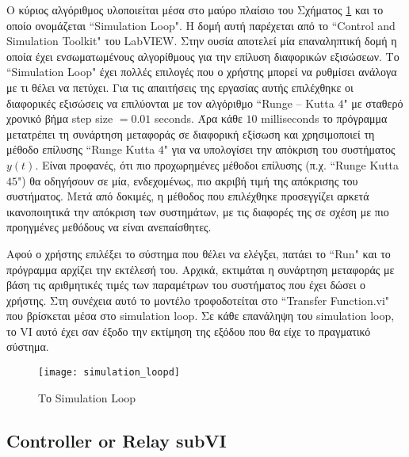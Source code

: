 Ο κύριος αλγόριθμος υλοποιείται μέσα στο μαύρο πλαίσιο του Σχήματος \ref{fig:simulation_loopd} και το οποίο ονομάζεται ``Simulation Loop". Η δομή αυτή παρέχεται από το ``Control and Simulation Toolkit" του LabVIEW. Στην ουσία αποτελεί μία επαναληπτική δομή η οποία έχει ενσωματωμένους αλγορίθμους για την επίλυση διαφορικών εξισώσεων. Το ``Simulation Loop" έχει πολλές επιλογές που ο χρήστης μπορεί να ρυθμίσει ανάλογα με τι θέλει να πετύχει. Για τις απαιτήσεις της εργασίας αυτής επιλέχθηκε οι διαφορικές εξισώσεις να επιλύονται με τον αλγόριθμο ``Runge -- Kutta $4$" με σταθερό χρονικό βήμα step size $= 0.01$ seconds. Άρα κάθε $10$ milliseconds το πρόγραμμα μετατρέπει τη συνάρτηση μεταφοράς σε διαφορική εξίσωση και χρησιμοποιεί τη μέθοδο επίλυσης ``Runge Kutta $4$" για να υπολογίσει την απόκριση του συστήματος $y(t)$. Είναι προφανές, ότι πιο προχωρημένες μέθοδοι επίλυσης (π.χ. ``Runge Kutta $45$") θα οδηγήσουν σε μία, ενδεχομένως, πιο ακριβή τιμή της απόκρισης του συστήματος. Μετά από δοκιμές, η μέθοδος που επιλέχθηκε προσεγγίζει αρκετά ικανοποιητικά την απόκριση των συστημάτων, με τις διαφορές της σε σχέση με πιο προηγμένες μεθόδους να είναι ανεπαίσθητες.

Αφού ο χρήστης επιλέξει το σύστημα που θέλει να ελέγξει, πατάει το ``Run" και το πρόγραμμα αρχίζει την εκτέλεσή του. Αρχικά, εκτιμάται η συνάρτηση μεταφοράς με βάση τις αριθμητικές τιμές των παραμέτρων του συστήματος που έχει δώσει ο χρήστης. Στη συνέχεια αυτό το μοντέλο τροφοδοτείται στο ``Transfer Function.vi" που βρίσκεται μέσα στο simulation loop. Σε κάθε επανάληψη του simulation loop, το VI αυτό έχει σαν έξοδο την εκτίμηση της εξόδου που θα είχε το πραγματικό σύστημα.

\begin{figure}[h]
  \centering
  \texttt{[image: simulation\_loopd]}
  \caption{Το Simulation Loop}
  \label{fig:simulation_loopd}
\end{figure}

\subsection{Controller or Relay subVI}

